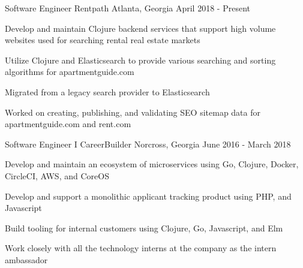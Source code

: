 

\begin{cventries}

  \cventry
    {Software Engineer} %
    {Rentpath} %
    {Atlanta, Georgia} %
    {April 2018 - Present} %
    {
      \begin{cvitems} %
        \item{Develop and maintain Clojure backend services that support high volume websites used for searching rental real estate markets}
        \item{Utilize Clojure and Elasticsearch to provide various searching and sorting algorithms for apartmentguide.com}
        \item{Migrated from a legacy search provider to Elasticsearch}
        \item{Worked on creating, publishing, and validating SEO sitemap data for apartmentguide.com and rent.com} 
      \end{cvitems} 
    }

  \cventry
    {Software Engineer I} %
    {CareerBuilder} %
    {Norcross, Georgia} %
    {June 2016 - March 2018} %
    {
      \begin{cvitems} %
        \item {Develop and maintain an ecosystem of microservices using Go, Clojure, Docker, CircleCI, AWS, and CoreOS}
        \item{Develop and support a monolithic applicant tracking product using PHP, and Javascript}
        \item{Build tooling for internal customers using Clojure, Go, Javascript, and Elm}
        \item {Work closely with all the technology interns at the company as the intern ambassador} 
      \end{cvitems} 
    }



\end{cventries}
